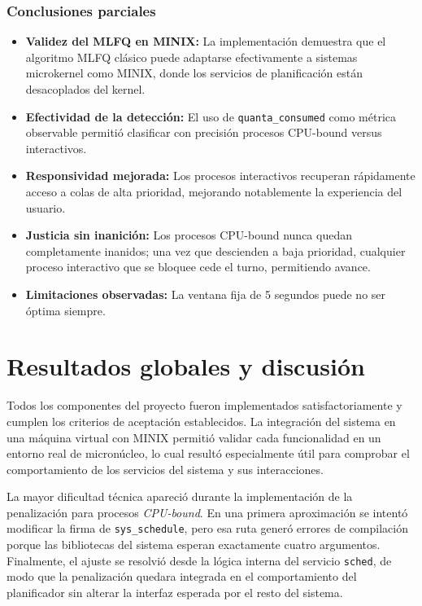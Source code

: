 \documentclass[12pt,spanish]{article}
\begin{document}
\subsubsection*{Conclusiones parciales}

\begin{itemize}
    \item \textbf{Validez del MLFQ en MINIX:} La implementación demuestra que el algoritmo MLFQ clásico puede adaptarse efectivamente a sistemas microkernel como MINIX, donde los servicios de planificación están desacoplados del kernel.
    \item \textbf{Efectividad de la detección:} El uso de \texttt{quanta\_consumed} como métrica observable permitió clasificar con precisión procesos CPU-bound versus interactivos.
    \item \textbf{Responsividad mejorada:} Los procesos interactivos recuperan rápidamente acceso a colas de alta prioridad, mejorando notablemente la experiencia del usuario.
    \item \textbf{Justicia sin inanición:} Los procesos CPU-bound nunca quedan completamente inanidos; una vez que descienden a baja prioridad, cualquier proceso interactivo que se bloquee cede el turno, permitiendo avance.
    \item \textbf{Limitaciones observadas:} La ventana fija de 5 segundos puede no ser óptima siempre.
\end{itemize}


\section{Resultados globales y discusión}

Todos los componentes del proyecto fueron implementados satisfactoriamente y cumplen los criterios de aceptación establecidos. La integración del sistema en una máquina virtual con MINIX permitió validar cada funcionalidad en un entorno real de micronúcleo, lo cual resultó especialmente útil para comprobar el comportamiento de los servicios del sistema y sus interacciones.

La mayor dificultad técnica apareció durante la implementación de la penalización para procesos \textit{CPU-bound}. En una primera aproximación se intentó modificar la firma de \texttt{sys\_schedule}, pero esa ruta generó errores de compilación porque las bibliotecas del sistema esperan exactamente cuatro argumentos. Finalmente, el ajuste se resolvió desde la lógica interna del servicio \texttt{sched}, de modo que la penalización quedara integrada en el comportamiento del planificador sin alterar la interfaz esperada por el resto del sistema.
\end{document}
